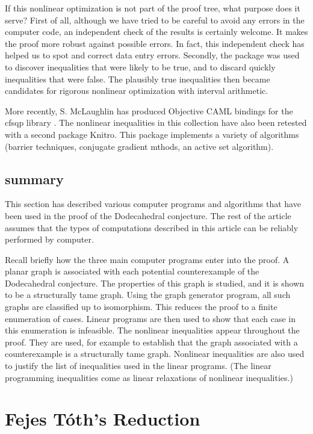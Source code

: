 If this nonlinear optimization is not part of the proof tree,
what purpose does it serve? First of all, although we have
tried to be careful to avoid any errors in the computer code,
an independent check of the results is certainly welcome.
It makes the proof more robust against possible errors.  
In fact,
this independent check has helped us to spot and correct 
 data entry errors.  Secondly, the package was used to discover
inequalities that were likely to be true, and to discard quickly
inequalities that were false.  The plausibly true inequalities
then became candidates for  rigorous nonlinear optimization
with interval arithmetic.

More recently, 
S. McLaughlin has produced Objective CAML bindings for the
cfsqp library \cite{McLp}.  The nonlinear inequalities in this
collection have also been retested with a second package
Knitro.  This package implements a variety of algorithms
(barrier techniques, conjugate gradient mthods, an active set algorithm).


\subsection{summary}

This section has described various computer programs 
and algorithms that
have been used in the proof of the Dodecahedral conjecture.
The rest of the article assumes that the types of
computations described in this article can be reliably performed
by computer.

Recall briefly how the three main computer programs
enter into the proof.  A planar graph is associated with
each potential counterexample of the Dodecahedral conjecture.
The properties of this graph is studied, and it is shown to
be a structurally tame graph.  Using the graph generator program,
all such graphs are classified up to isomorphism.  This
reduces the proof to a finite enumeration of cases. Linear programs
are then used to show that each case in this enumeration is 
infeasible.  The nonlinear inequalities appear throughout the proof.
They are used, for example to establish that the graph associated
with a counterexample is a structurally tame graph.  Nonlinear
inequalities are also used to justify the list of inequalities
used in the linear programs. (The linear programming inequalities
come as linear relaxations of nonlinear inequalities.)



\section{Fejes T\'oth's Reduction}\label{sec:12sphere}

